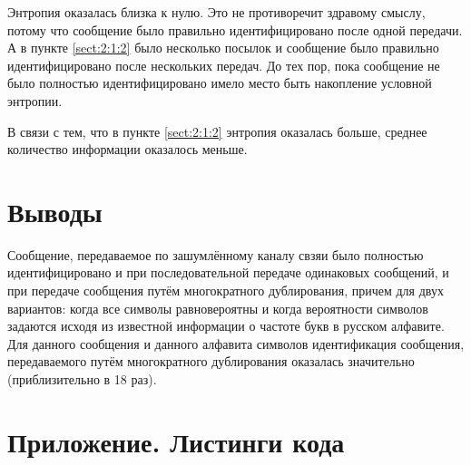 Энтропия оказалась близка к нулю. Это не противоречит здравому смыслу, потому что сообщение было правильно идентифицировано после одной передачи. А в пункте \ref{sect:2:1:2} было несколько посылок и сообщение было правильно идентифицировано после нескольких передач. До тех пор, пока сообщение не было полностью идентифицировано имело место быть накопление условной энтропии.

В связи с тем, что в пункте \ref{sect:2:1:2} энтропия оказалась больше, среднее количество информации оказалось меньше.

\newpage

\section{Выводы}

Сообщение, передаваемое по зашумлённому каналу свзяи было полностью идентифицировано и при последовательной передаче одинаковых сообщений, и при передаче сообщения путём многократного дублирования, причем для двух вариантов: когда все символы равновероятны и когда вероятности символов задаются исходя из известной информации о частоте букв в русском алфавите. Для данного сообщения и данного алфавита символов идентификация сообщения, передаваемого путём многократного дублирования оказалась значительно (приблизительно в 18 раз).

\newpage
\section{Приложение. Листинги кода}


\parindent=1cm

\newpage


\parindent=1cm

\newpage


\parindent=1cm


\parindent=1cm


\parindent=1cm


\parindent=1cm

\newpage


\parindent=1cm


\parindent=1cm

\newpage


\parindent=1cm


